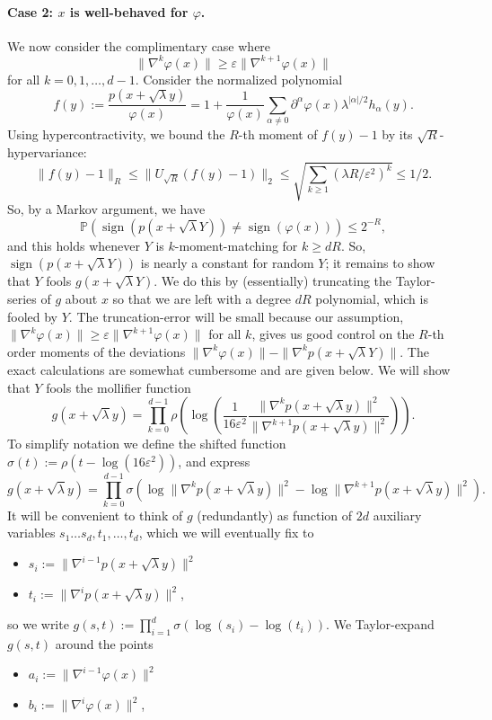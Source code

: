 \paragraph{Case 2: $x$ is well-behaved for $\varphi$.} We now consider the complimentary case where
\[\|\nabla^k\varphi(x)\|\geq\varepsilon\|\nabla^{k+1}\varphi(x)\|\]
for all $k=0,1,\ldots,d-1$. Consider the normalized polynomial
\[f(y):=\frac{p(x+\sqrt\lambda y)}{\varphi(x)}=1+\frac1{\varphi(x)}\sum_{\alpha\neq0}\partial^\alpha\varphi(x)\lambda^{|\alpha|/2}h_\alpha(y).\]
Using hypercontractivity, we bound the $R$-th moment of $f(y)-1$ by its $\sqrt R$-hypervariance:
\[\|f(y)-1\|_R\leq\|U_{\sqrt R}(f(y)-1)\|_2\leq\sqrt{\sum_{k\geq1}(\lambda R/\varepsilon^2)^k}\leq1/2.\]
So, by a Markov argument, we have
\[\mathbb P(\operatorname{sign}(p(x+\sqrt\lambda Y))\neq\operatorname{sign}(\varphi(x)))\leq2^{-R},\]
and this holds whenever $Y$ is $k$-moment-matching for $k\geq dR$. So, $\operatorname{sign}(p(x+\sqrt\lambda Y))$ is nearly a constant for random $Y$; it remains to show that $Y$ fools $g(x+\sqrt\lambda Y)$. We do this by (essentially) truncating the Taylor-series of $g$ about $x$ so that we are left with a degree $dR$ polynomial, which is fooled by $Y$. The truncation-error will be small because our assumption, $\|\nabla^k\varphi(x)\|\geq\varepsilon\|\nabla^{k+1}\varphi(x)\|$ for all $k$, gives us good control on the $R$-th order moments of the deviations $\|\nabla^k\varphi(x)\|-\|\nabla^kp(x+\sqrt\lambda Y)\|$. The exact calculations are somewhat cumbersome and are given below. We will show that $Y$ fools the mollifier function
\[g(x+\sqrt\lambda y)=\prod_{k=0}^{d-1}\rho\left(\log\left(\frac1{16\varepsilon^2}\frac{\|\nabla^kp(x+\sqrt\lambda y)\|^2}{\|\nabla^{k+1}p(x+\sqrt\lambda y)\|^2}\right)\right).\]
To simplify notation we define the shifted function $\sigma(t):=\rho(t-\log(16\varepsilon^2))$, and express
\[g(x+\sqrt\lambda y)=\prod_{k=0}^{d-1}\sigma(\log\|\nabla^kp(x+\sqrt\lambda y)\|^2-\log\|\nabla^{k+1}p(x+\sqrt\lambda y)\|^2).\]
It will be convenient to think of $g$ (redundantly) as function of $2d$ auxiliary variables $s_1\ldots s_d,t_1,\ldots,t_d$, which we will eventually fix to
\begin{itemize}
\item $s_i:=\|\nabla^{i-1}p(x+\sqrt\lambda y)\|^2$
\item $t_i:=\|\nabla^ip(x+\sqrt\lambda y)\|^2$,
\end{itemize}
so we write $g(s,t):=\prod_{i=1}^d\sigma(\log(s_i)-\log(t_i))$.
We Taylor-expand $g(s,t)$ around the points
\begin{itemize}
\item $a_i:=\|\nabla^{i-1}\varphi(x)\|^2$
\item $b_i:=\|\nabla^i\varphi(x)\|^2$,
\end{itemize}
